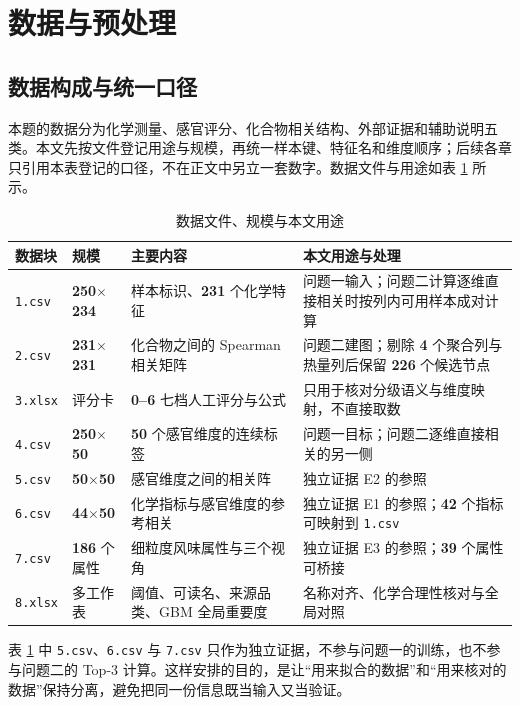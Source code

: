 \section{数据与预处理}

\subsection{数据构成与统一口径}

本题的数据分为化学测量、感官评分、化合物相关结构、外部证据和辅助说明五类。本文先按文件登记用途与规模，再统一样本键、特征名和维度顺序；后续各章只引用本表登记的口径，不在正文中另立一套数字。数据文件与用途如表 \ref{tab:data-files} 所示。

\begin{table}[H]
\centering
{}
\begin{tabularx}{\textwidth}{@{}p{}p{}X p{}@{}}
\toprule
数据块 & 规模 & 主要内容 & 本文用途与处理 \\
\midrule
\texttt{1.csv} & \textbf{250}$\times$\textbf{234} & 样本标识、\textbf{231} 个化学特征 & 问题一输入；问题二计算逐维直接相关时按列内可用样本成对计算 \\
\texttt{2.csv} & \textbf{231}$\times$\textbf{231} & 化合物之间的 Spearman 相关矩阵 & 问题二建图；剔除 \textbf{4} 个聚合列与热量列后保留 \textbf{226} 个候选节点 \\
\texttt{3.xlsx} & 评分卡 & \textbf{0--6} 七档人工评分与公式 & 只用于核对分级语义与维度映射，不直接取数 \\
\texttt{4.csv} & \textbf{250}$\times$\textbf{50} & \textbf{50} 个感官维度的连续标签 & 问题一目标；问题二逐维直接相关的另一侧 \\
\texttt{5.csv} & \textbf{50}$\times$\textbf{50} & 感官维度之间的相关阵 & 独立证据 E2 的参照 \\
\texttt{6.csv} & \textbf{44}$\times$\textbf{50} & 化学指标与感官维度的参考相关 & 独立证据 E1 的参照；\textbf{42} 个指标可映射到 \texttt{1.csv} \\
\texttt{7.csv} & \textbf{186} 个属性 & 细粒度风味属性与三个视角 & 独立证据 E3 的参照；\textbf{39} 个属性可桥接 \\
\texttt{8.xlsx} & 多工作表 & 阈值、可读名、来源品类、GBM 全局重要度 & 名称对齐、化学合理性核对与全局对照 \\
\bottomrule
\end{tabularx}
\caption{数据文件、规模与本文用途}
\label{tab:data-files}
\end{table}

表 \ref{tab:data-files} 中 \texttt{5.csv}、\texttt{6.csv} 与 \texttt{7.csv} 只作为独立证据，不参与问题一的训练，也不参与问题二的 Top-3 计算。这样安排的目的，是让“用来拟合的数据”和“用来核对的数据”保持分离，避免把同一份信息既当输入又当验证。

